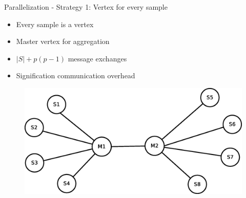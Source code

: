 \documentclass{beamer}
\begin{document}
\begin{frame}{Parallelization - Strategy 1: Vertex for every sample}

\begin{itemize}
\item Every sample is a vertex  
\item Master vertex for aggregation
\item $|S| + p(p-1)$ message exchanges 
\item Signification communication overhead
\end{itemize}

\begin{figure}[!htb]
  \centering
  \includegraphics[scale=0.30]{graph1.eps}
  \label{fig:vs:graph1}
\end{figure}

\end{frame}

\end{document}
